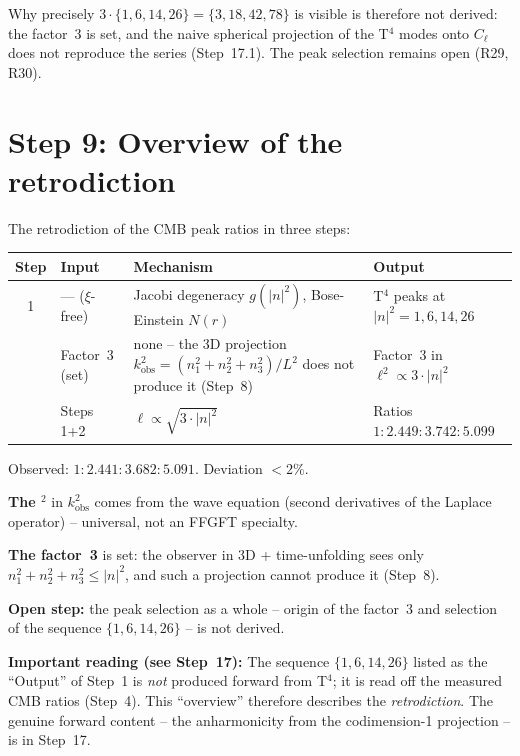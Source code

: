 Why precisely $3\cdot\{1,6,14,26\}=\{3,18,42,78\}$ is visible is therefore
not derived: the factor~3 is set, and the naive spherical projection of the
T$^4$ modes onto $C_\ell$ does not reproduce the series (Step~17.1). The peak
selection remains open (R29, R30).

\section{Step 9: Overview of the retrodiction}

The retrodiction of the CMB peak ratios in three steps:

\begin{center}
\begin{tabular}{c p{2.1cm} p{6.3cm} p{3.8cm}}
\toprule
Step & Input & Mechanism & Output \\
\midrule
1 & --- ($\xi$-free) &
  Jacobi degeneracy $g(|n|^2)$, Bose-Einstein $N(r)$ &
  T$^4$ peaks at $|n|^2 = 1, 6, 14, 26$ \\
\addlinespace
2 & Factor~3 (set) &
  none -- the 3D projection
  $k_\mathrm{obs}^2 = (n_1^2+n_2^2+n_3^2)/L^2$ does not produce it (Step~8) &
  Factor~3 in $\ell^2 \propto 3\cdot|n|^2$ \\
\addlinespace
3 & Steps 1+2 &
  $\ell \propto \sqrt{3\cdot|n|^2}$ &
  Ratios $1:2{.}449:3{.}742:5{.}099$ \\
\bottomrule
\end{tabular}
\end{center}

Observed: $1:2{.}441:3{.}682:5{.}091$. Deviation $< 2\%$.

\textbf{The $^2$} in $k_\mathrm{obs}^2$ comes from the wave equation
(second derivatives of the Laplace operator) -- universal, not an FFGFT specialty.

\textbf{The factor~3} is set: the observer in 3D + time-unfolding sees
only $n_1^2+n_2^2+n_3^2 \le |n|^2$, and such a projection cannot produce it
(Step~8).

\textbf{Open step:} the peak selection as a whole -- origin of the factor~3
and selection of the sequence $\{1,6,14,26\}$ -- is not derived.

\textbf{Important reading (see Step~17):} The sequence $\{1,6,14,26\}$ listed
as the ``Output'' of Step~1 is \emph{not} produced forward from T$^4$; it is
read off the measured CMB ratios (Step~4). This ``overview'' therefore
describes the \emph{retrodiction}. The genuine forward content -- the
anharmonicity from the codimension-1 projection -- is in Step~17.

